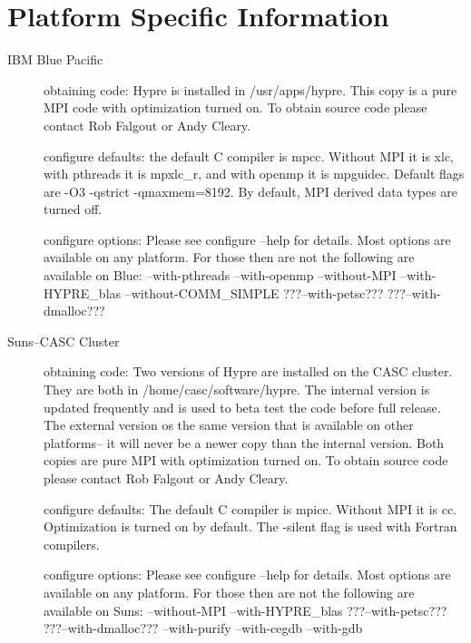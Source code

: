 \section{Platform Specific Information}
\begin{description}

\item[IBM Blue Pacific]
obtaining code:
\newline
Hypre is installed in /usr/apps/hypre.  This copy is a pure MPI code with optimization turned on.  To obtain source code please contact Rob Falgout or Andy Cleary.
\newline

configure defaults:
\newline
the default C compiler is mpcc.  Without MPI it is xlc, with pthreads it is mpxlc\_r, and with openmp it is mpguidec.  Default flags are -O3 -qstrict -qmaxmem=8192.  By default, MPI derived data types are turned off.      
\newline

configure options:
\newline
Please see configure --help for details.  Most options are available on any platform.  For those then are not the following are available on Blue:  --with-pthreads --with-openmp --without-MPI --with-HYPRE\_blas --without-COMM\_SIMPLE ???--with-petsc???  ???--with-dmalloc???
\newline


\item[Suns--CASC Cluster]
obtaining code:
\newline
Two versions of Hypre are installed on the CASC cluster.  They are both in /home/casc/software/hypre.  The internal version is updated frequently and is used to beta test the code before full release.  The external version os the same version that is available on other platforms-- it will never be a newer copy than the internal version.  Both copies are pure MPI with optimization turned on. To obtain source code please contact Rob Falgout or Andy Cleary.
\newline

configure defaults:
\newline
The default C compiler is mpicc.  Without MPI it is cc.  Optimization is turned on by default.  The -silent flag is used with Fortran compilers.  
\newline

configure options:
\newline
Please see configure --help for details.  Most options are available on any platform.  For those then are not the following are available on Suns:  --without-MPI --with-HYPRE\_blas ???--with-petsc???  ???--with-dmalloc??? --with-purify --with-cegdb --with-gdb
\newline


\end{description}
